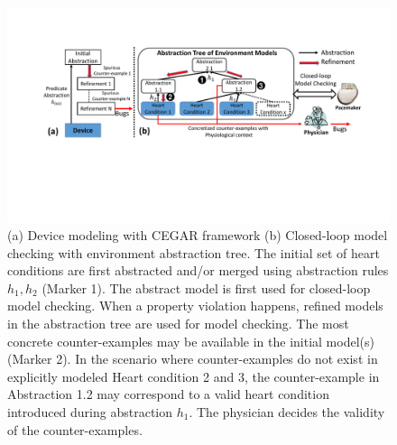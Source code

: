 \begin{figure}[!t]
		\centering
		\includegraphics[width=\textwidth]{figs/distinction.pdf}
		\caption{\small (a) Device modeling with CEGAR framework (b) Closed-loop model checking with environment abstraction tree. The initial set of heart conditions are first abstracted and/or merged using abstraction rules $h_1,h_2$ (Marker 1). The abstract model is first used for closed-loop model checking. When a property violation happens, refined models in the abstraction tree are used for model checking. The most concrete counter-examples may be available in the initial model(s) (Marker 2). In the scenario where counter-examples do not exist in explicitly modeled Heart condition 2 and 3, the counter-example in Abstraction 1.2 may correspond to a valid heart condition introduced during abstraction $h_1$. The physician decides the validity of the counter-examples.}
		  \vspace{-10pt}
		\label{fig:distinction}
\end{figure}


